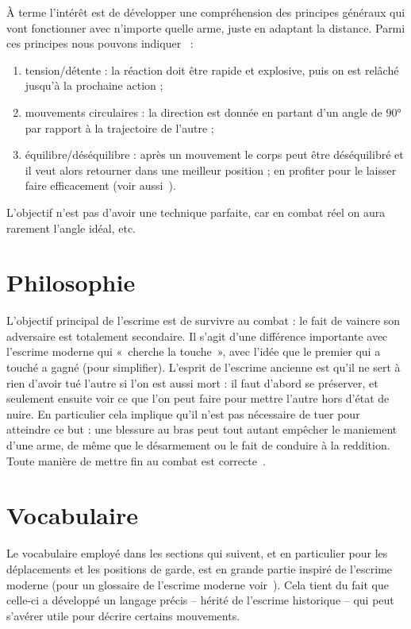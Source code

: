 À terme l'intérêt est de développer une compréhension des principes généraux qui vont fonctionner avec n'importe quelle arme, juste en adaptant la distance.
Parmi ces principes nous pouvons indiquer~\cite{enzi:dijon:messer_inner:2015} :
\begin{enumerate}
	\item tension/détente : la réaction doit être rapide et explosive, puis on est relâché jusqu'à la prochaine action ;
	\item mouvements circulaires : la direction est donnée en partant d'un angle de 90° par rapport à la trajectoire de l'autre ;
	\item équilibre/déséquilibre : après un mouvement le corps peut être déséquilibré et il veut alors retourner dans une meilleur position ; en profiter pour le laisser faire efficacement (voir aussi~\cite{guidoux:dijon:thibault:2015}).
\end{enumerate}
L'objectif n'est pas d'avoir une technique parfaite, car en combat réel on aura rarement l'angle idéal, etc.


\section{Philosophie}


L'objectif principal de l'escrime est de survivre au combat : le fait de vaincre son adversaire est totalement secondaire.
Il s'agit d'une différence importante avec l'escrime moderne qui « cherche la touche », avec l'idée que le premier qui a touché a gagné (pour simplifier).
L'esprit de l'escrime ancienne est qu'il ne sert à rien d'avoir tué l'autre si l'on est aussi mort : il faut d'abord se préserver, et seulement ensuite voir ce que l'on peut faire pour mettre l'autre hors d'état de nuire.
En particulier cela implique qu'il n'est pas nécessaire de tuer pour atteindre ce but : une blessure au bras peut tout autant empêcher le maniement d'une arme, de même que le désarmement ou le fait de conduire à la reddition.
Toute manière de mettre fin au combat est correcte~\footnotemark{}.



\section{Vocabulaire}


Le vocabulaire employé dans les sections qui suivent, et en particulier pour les déplacements et les positions de garde, est en grande partie inspiré de l'escrime moderne (pour un glossaire de l'escrime moderne voir~\cite{FIE:2014:BrefsGlossairesLescrime}).
Cela tient du fait que celle-ci a développé un langage précis -- hérité de l'escrime historique -- qui peut s'avérer utile pour décrire certains mouvements.
